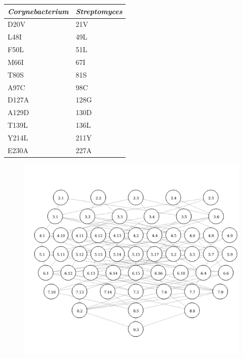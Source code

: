\documentclass[12pt,twoside]{reedthesis}
\begin{document}
  \begin{longtable}[]{@{}ll@{}}
  \toprule
  \emph{Corynebacterium} & \emph{Streptomyces}\tabularnewline
  \midrule
  \endhead
  D20V & 21V\tabularnewline
  L48I & 49L\tabularnewline
  F50L & 51L\tabularnewline
  M66I & 67I\tabularnewline
  T80S & 81S\tabularnewline
  A97C & 98C\tabularnewline
  D127A & 128G\tabularnewline
  A129D & 130D\tabularnewline
  T139L & 136L\tabularnewline
  Y214L & 211Y\tabularnewline
  E230A & 227A\tabularnewline
  \bottomrule
  \end{longtable}
  
  \begin{figure}[h!tbp]
  \centering
  \includegraphics[angle = 0,scale = 0.6]{conclusion/Solocirculos.png}
  \caption[Non darwinian trayectories]{\footnotesize{}}
  \label{fig:PriARutas}
  \end{figure}
  
\end{document}
